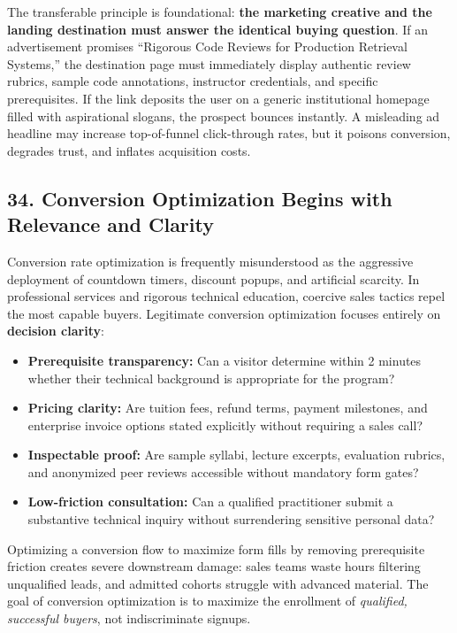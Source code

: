 The transferable principle is foundational: \textbf{the marketing creative and the landing destination must answer the identical buying question}. If an advertisement promises ``Rigorous Code Reviews for Production Retrieval Systems,'' the destination page must immediately display authentic review rubrics, sample code annotations, instructor credentials, and specific prerequisites. If the link deposits the user on a generic institutional homepage filled with aspirational slogans, the prospect bounces instantly. A misleading ad headline may increase top-of-funnel click-through rates, but it poisons conversion, degrades trust, and inflates acquisition costs.

\subsection*{34. Conversion Optimization Begins with Relevance and Clarity}

Conversion rate optimization is frequently misunderstood as the aggressive deployment of countdown timers, discount popups, and artificial scarcity. In professional services and rigorous technical education, coercive sales tactics repel the most capable buyers. Legitimate conversion optimization focuses entirely on \textbf{decision clarity}:
\begin{itemize}[leftmargin=*,itemsep=1pt]
  \item \textbf{Prerequisite transparency:} Can a visitor determine within 2 minutes whether their technical background is appropriate for the program?
  \item \textbf{Pricing clarity:} Are tuition fees, refund terms, payment milestones, and enterprise invoice options stated explicitly without requiring a sales call?
  \item \textbf{Inspectable proof:} Are sample syllabi, lecture excerpts, evaluation rubrics, and anonymized peer reviews accessible without mandatory form gates?
  \item \textbf{Low-friction consultation:} Can a qualified practitioner submit a substantive technical inquiry without surrendering sensitive personal data?
\end{itemize}

Optimizing a conversion flow to maximize form fills by removing prerequisite friction creates severe downstream damage: sales teams waste hours filtering unqualified leads, and admitted cohorts struggle with advanced material. The goal of conversion optimization is to maximize the enrollment of \textit{qualified, successful buyers}, not indiscriminate signups.

